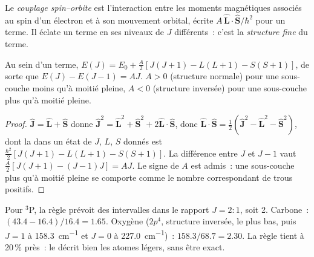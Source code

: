 \begin{definition}\label{def:b3:many-electron-atoms:spin-orbit}
Le \emph{couplage spin--orbite} est
l'interaction entre les moments magnétiques associés au spin d'un
électron et à son mouvement orbital, écrite $A\,\hat{\mathbf L}\cdot\hat{\mathbf S}/\hbar^2$
pour un terme. Il éclate un terme en ses niveaux de $J$ différents~: c'est
la \emph{structure fine} du terme.
\end{definition}

\begin{proposition}\label{prop:b3:many-electron-atoms:lande}
Au sein d'un terme, $E(J) = E_0 + \frac{A}{2}[J(J+1) - L(L+1) - S(S+1)]$, de sorte que
$E(J) - E(J - 1) = AJ$. $A > 0$ (structure normale) pour une sous-couche
moins qu'à moitié pleine,
$A < 0$ (structure inversée) pour une sous-couche plus qu'à moitié pleine.
\end{proposition}

\begin{proof}
$\hat{\mathbf J} = \hat{\mathbf L} + \hat{\mathbf S}$ donne $\hat{\mathbf J}^2 =
\hat{\mathbf L}^2 + \hat{\mathbf S}^2 + 2\hat{\mathbf L}\cdot\hat{\mathbf S}$, donc
$\hat{\mathbf L}\cdot\hat{\mathbf S} = \frac12(\hat{\mathbf J}^2 - \hat{\mathbf L}^2 -
\hat{\mathbf S}^2)$, dont la  dans un état de $J$, $L$, $S$
donnés est
$\frac{\hbar^2}{2}[J(J+1) - L(L+1) - S(S+1)]$. La différence entre $J$ et
$J - 1$ vaut $\frac A2[J(J+1) - (J-1)J] = AJ$. Le signe de $A$ est admis~:
une sous-couche plus qu'à moitié pleine se comporte comme le nombre
correspondant de trous positifs.
\end{proof}

\begin{example}\label{ex:b3:many-electron-atoms:lande-test}
Pour ${}^3$P, la règle prévoit des intervalles dans le rapport $J = 2 : 1$,
soit 2. Carbone~: $(43.4 - 16.4)/16.4 = 1.65$. Oxygène ($2p^4$, structure
inversée, 
le plus bas, puis $J = 1$ à \qty{158.3}{cm^{-1}} et $J = 0$ à \qty{227.0}{cm^{-1}})~:
$158.3/68.7 = 2.30$. La règle tient à 20\,\% près~: le  décrit bien les atomes légers, sans être exact.
\end{example}

